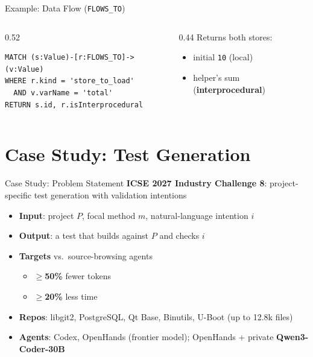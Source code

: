 \documentclass[aspectratio=169,10pt]{beamer}
\newcommand{\code}[1]{\texttt{#1}}
\begin{document}
\begin{frame}[fragile]{Example: Data Flow (\code{FLOWS\_TO})}
  \vspace{0.6em}
  \begin{columns}[T]
    \begin{column}{0.52\textwidth}
\begin{lstlisting}[language=Cypher]
MATCH (s:Value)-[r:FLOWS_TO]->(v:Value)
WHERE r.kind = 'store_to_load'
  AND v.varName = 'total'
RETURN s.id, r.isInterprocedural
\end{lstlisting}
    \end{column}
    \begin{column}{0.44\textwidth}
      \small
      Returns both stores:
      \begin{itemize}
        \item initial \code{10} (local)
        \item helper's sum (\textbf{interprocedural})
      \end{itemize}
    \end{column}
  \end{columns}
\end{frame}

\section{Case Study: Test Generation}

\begin{frame}{Case Study: Problem Statement}
  \textbf{ICSE 2027 Industry Challenge 8}: project-specific test generation
  with validation intentions

  \vspace{0.8em}
  \begin{itemize}
    \item \textbf{Input}: project $P$, focal method $m$, natural-language intention $i$
    \item \textbf{Output}: a test that builds against $P$ and checks $i$
    \item \textbf{Targets} vs.\ source-browsing agents
          \begin{itemize}
            \item $\geq$\textbf{50\%} fewer tokens
            \item $\geq$\textbf{20\%} less time
          \end{itemize}
    \item \textbf{Repos}: libgit2, PostgreSQL, Qt Base, Binutils, U-Boot (up to 12.8k files)
    \item \textbf{Agents}: Codex, OpenHands (frontier model);
          OpenHands + private \textbf{Qwen3-Coder-30B}
  \end{itemize}
\end{frame}
\end{document}
